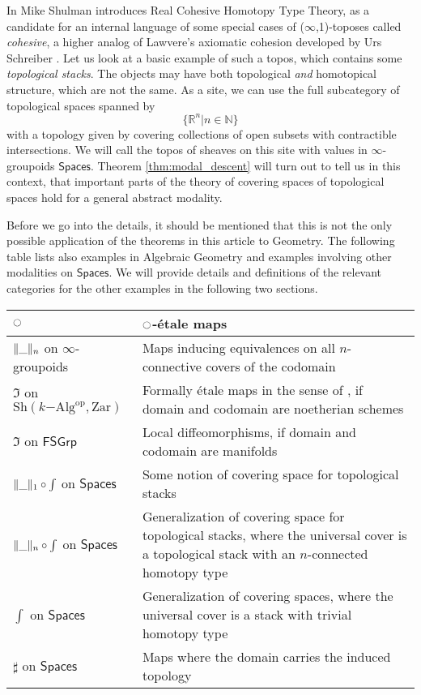 \documentclass[9pt,twosided]{amsart}
\newcommand{\shape}{\int}
\newcommand{\bN}{\mathbb N}
\newcommand{\bR}{\mathbb R}
\newcommand{\Zar}{\ensuremath{\mathrm{Zar}}}
\newcommand{\FSGrp}{\ensuremath{\mathsf{FSGrp}}}
\newcommand{\Spaces}{\ensuremath{\mathsf{Spaces}}}
\begin{document}
In \cite{ShulmanRealCohesion} Mike Shulman introduces Real Cohesive Homotopy Type Theory, as a candidate for an internal language
of some special cases of ($\infty$,1)-toposes called \emph{cohesive}, a higher analog 
of Lawvere's axiomatic cohesion \cite{Lawvere07} developed by Urs Schreiber \cite{SchreiberDcct}.
Let us look at a basic example of such a topos, which contains some \emph{topological stacks}.
The objects may have both topological \emph{and} homotopical structure, which are not the same.
As a site, we can use the full subcategory of topological spaces spanned by
\[ \{ \bR^n \vert n\in\bN\}\]
with a topology given by covering collections of open subsets with contractible intersections.
We will call the topos of sheaves on this site with values in $\infty$-groupoids $\Spaces$. 
Theorem \ref{thm:modal_descent} will turn out to tell us in this context, that important parts of the theory of covering spaces of topological spaces hold for a general abstract modality.

Before we go into the details, it should be mentioned that this is not the only possible application of the theorems in this article to Geometry.
The following table lists also examples in Algebraic Geometry and examples involving other modalities on $\Spaces$.
We will provide details and definitions of the relevant categories for the other examples in the following two sections.

\begin{center}
  \begin{tabular}{p{5cm}p{7cm}}
    \toprule
    ${\ocircle}$ & ${\ocircle}$-étale maps  \\
    \midrule
    $\trunc{n}{\_}$ on $\infty$-groupoids & Maps inducing equivalences on all $n$-connective covers of the codomain \\
    $\Im$ on $\mathrm{Sh}(k\mathrm{-Alg}^\mathrm{op} ,\Zar)$ & Formally étale maps in the sense of \cite{GrothendieckDieudonne}, if domain and codomain are noetherian schemes   \\
    $\Im$ on $\FSGrp$ & Local diffeomorphisms, if domain and codomain are manifolds \\
    $\trunc{1}{\_}\circ\shape$ on $\Spaces$ & Some notion of covering space for topological stacks \\
    $\trunc{n}{\_}\circ\shape$ on $\Spaces$ & Generalization of covering space for topological stacks, where the universal cover is a topological stack with an $n$-connected homotopy type \\
    $\shape$ on $\Spaces$ & Generalization of covering spaces, where the universal cover is a stack with trivial homotopy type \\
    $\sharp$ on $\Spaces$ & Maps where the domain carries the induced topology \\
    \bottomrule
  \end{tabular}
\end{center}
\end{document}
